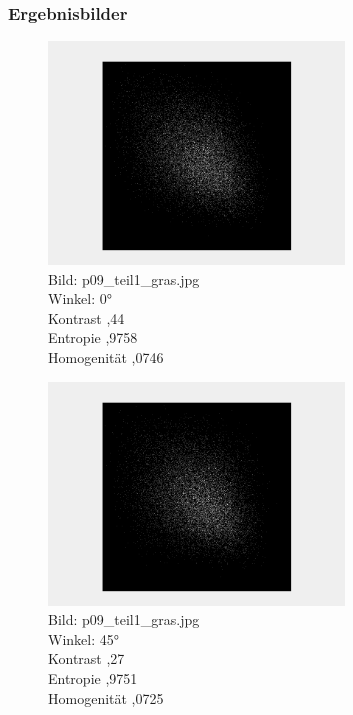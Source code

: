 \documentclass[12pt]{article}
\begin{document}
\subsubsection*{Ergebnisbilder}
\begin{figure}[H]
  \centering
  \includegraphics[width=0.7\textwidth, keepaspectratio]{texture_a1.png}\\
  Bild: p09\_teil1\_gras.jpg\\
  Winkel: 0°\\
  Kontrast ,44\\
  Entropie ,9758\\
  Homogenität ,0746
\end{figure}
\begin{figure}[H]
  \centering
  \includegraphics[width=0.7\textwidth, keepaspectratio]{texture_a2.png}\\
  Bild: p09\_teil1\_gras.jpg\\
  Winkel: 45°\\
  Kontrast ,27\\
  Entropie ,9751\\
  Homogenität ,0725
\end{figure}
\end{document}
